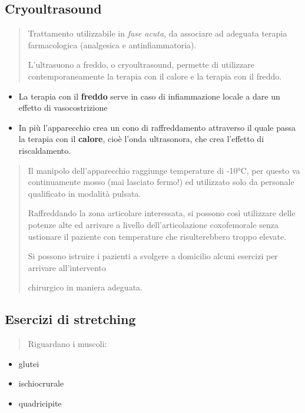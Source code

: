 \documentclass[]{article}
\begin{document}
\subsection{Cryoultrasound}\label{cryoultrasound}

\begin{quote}
Trattamento utilizzabile in \emph{fase acuta}, da associare ad adeguata
terapia farmacologica (analgesica e antinfiammatoria).

L'ultrasuono a freddo, o cryoultrasound, permette di utilizzare
contemporaneamente la terapia con il calore e la terapia con il freddo.
\end{quote}

\begin{itemize}
\item
  La terapia con il \textbf{freddo} serve in caso di infiammazione
  locale a dare un effetto di vasocostrizione
\item
  In più l'apparecchio crea un cono di raffreddamento attraverso il
  quale passa la terapia con il \textbf{calore}, cioè l'onda
  ultrasonora, che crea l'effetto di riscaldamento.
\end{itemize}

\begin{quote}
Il manipolo dell'apparecchio raggiunge temperature di -10°C, per questo
va continuamente mosso (mai lasciato fermo!) ed utilizzato solo da
personale qualificato in modalità pulsata.

Raffreddando la zona articolare interessata, si possono così utilizzare
delle potenze alte ed arrivare a livello dell'articolazione coxofemorale
senza ustionare il paziente con temperature che risulterebbero troppo
elevate.

Si possono istruire i pazienti a svolgere a domicilio alcuni esercizi
per arrivare all'intervento

chirurgico in maniera adeguata.
\end{quote}

\subsection{Esercizi di stretching}\label{esercizi-di-stretching}

\begin{quote}
Riguardano i muscoli:
\end{quote}

\begin{itemize}
\item
  glutei
\item
  ischiocrurale
\item
  quadricipite
\end{itemize}
\end{document}
